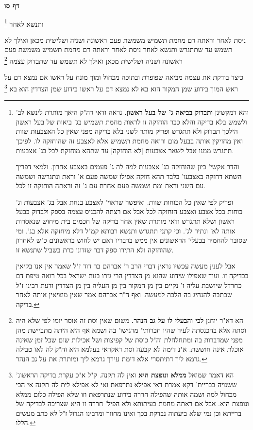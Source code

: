 \documentclass[12pt, openany]{book}
\newcommand{\sethebfont}{
\fontsize{10.5pt}{21.0pt} \selectfont
}
\newcommand{\twocol}[1]{
	{\sethebfont \begin{multicols}{2}
			#1
	\end{multicols}}	
}
\newcommand{\sectname}{}
\newcommand{\newsection}[1]{
	\addcontentsline{toc}{section}{#1}
	\renewcommand{\sectname}{#1}	
	\vspace{-\baselineskip}
	\begin{center}
		\textbf{%
\fontsize{16pt}{16pt}\selectfont
			#1}
	\end{center}
	\vspace{-\baselineskip}
	\nopagebreak
}
\newcommand{\footnotecomment}[1]{\footnote{#1}}
\newcommand{\commenta}[1]{\footnotecomment{#1}}
\begin{document}
\newsection{דף סו}
\twocol{ותנשא לאחר 
\commenta{ והא דמקשינן \textbf{ותבדוק בביאה ג' של בעל ראשון.}  נראה ודאי דה"ק היאך מותרת לינשא לב' ולשמש בלא בדיקה והלא כבר הוחזקה זו לראות מחמת תשמיש בג' ביאות של בעל ראשון הילכך תבדוק ולא תתגרש ופריק מותר לשני בלא בדיקה מפני שאין כל האצבעות שוות ואין מחזיקין אותה בבעל מום ורואה מחמת תשמיש אלא לאצבע זה שהוחזקה לו. לפיכך תתגרש ממנו אבל לשאר אצבעות [לא הוחזקה] עד שתהא מוחזקת לכל בג' אצבעות.\par  והדר אקשי' כיון שהוחזקה בג' אצבעות למה לה ג' פעמים באצבע אחרון. ולמאי דפריך השתא דחזקה באצבעו' בלבד תהא חזקה אפילו שמשה פעם א' וראת ונתגרשה ושמשה עם השני וראת ומת ושמשה פעם אחרת עם ג' זה וראתה הוחזקה זו לכל.\par  ופריק לפי שאין כל הכוחות שוות. ואיפשר שראוי' לאצבע בנחת אבל בג' אצבעות וג' כוחות בכל אצבע ואצבע הוחזקה לכל אבל אם רצתה להכניס עצמה בספק ולבדוק בבעל ראשון ושלא תתגרש ודאי מותרת שאין אחר בדיקה של חכמים בית מיחוש שנאסרות אותה לא' ונתיר לג'. וכי קתני תתגרש ותנשא רבותא קמ"ל דלא מיחזקה אלא בג'. ומי שסובר להחמיר בבעלי' הראשונים אין ממש בדבריו דאם יש לחוש בראשונים כ"ש לאחרון שהוחזקה ולא התירו ספק דבר שזדונו כרת בשביל שתנשא זו.\par  אבל לענין מעשה עכשיו נראין דברי הרב ר' אברהם בר דוד ז"ל שאמר אין אנו בקיאין בבדיקה זו. ועוד שאפילו שידוע שהוא מן הצדדין הרי גזרו בנות ישראל בכל רואה טיפת דם כחרדל שיושבת עליה ז' נקיים בין מן המקור בין מן העליה בין מן הצדדין ודעת רבינו ז"ל שכתבה להנהיג בה הלכה למעשה. ואף ה"ר אברהם אמר שאין מוציאין אותה לאחר בדיקה. }

ניסת לאחר וראתה דם מחמת תשמיש משמשת פעם ראשונה ושניה ושלישית מכאן ואילך לא תשמש עד שתתגרש ותנשא לאחר  ניסת לאחר וראתה דם מחמת תשמיש משמשת פעם ראשונה ושניה ושלישית מכאן ואילך לא תשמש עד שתבדוק עצמה 
\commenta{הא דא"ר יוחנן \textbf{לכי והבעלי לו על גב הנהר.}  משום שאין וסת זה אוסר יומו לפי שלא היה וסתה אלא בהכנסתה לעיר שהיו חברותי' מרגישו' בה ושמא אף היא היתה מתביישת מהן מפני שמדברות בה ומתחלחלת וה"ל כוסת של קפיצות ושל אכילות שום שכל זמן שאינה אוכלת אינה חוששת. א"נ דימה לא קבעה וסת דאקראי בעלמא היא וה"ק לה לאו טבילה גרמא ליך דתיתסרי אלא דימת עירך גרמא ליך ומותרת את על גב הנהר. }

כיצד בודקת את עצמה מביאה שפופרת ובתוכה מכחול ומוך מונח על ראשו אם נמצא דם על ראש המוך בידוע שמן המקור הוא בא לא נמצא דם על ראשו בידוע שמן הצדדין הוא בא 
\commenta{הא דאמר שמואל \textbf{ממלא ונופצת היא}  ואין לה תקנה. ק"ל א"כ עקרת בדיקה הראשונ' ששנויה בבריית' דקא אמרת דאי אפילא נתרפאת ואי לא אפילא לית לה תקנה אי הכי מכחול למה ושמה אותה שהפילה חררה בידוע שנתרפאת וזו שלא הפילה כלום ממלא ונופצת היא. אבל אם ראתה מחמת בעיתותא ולא הפיל' חררה זו היא שצריכה לבדיקה של ברייתא וכן נמי שלא ביעתוה נבדקת בכך ואינו מחוור ומרבינו הגדול ז"ל לא כתב מעשים הללו. }

}
\end{document}

